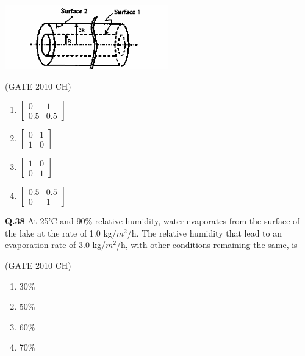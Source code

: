 \documentclass[journal,12pt,onecolumn]{exam}
\theoremstyle{remark}
\begin{document}
 \includegraphics[width=1.0\linewidth]{images/Q.37 image.png}
     
\hfill{(GATE 2010 CH)}\\


\begin{enumerate}

    \item $\begin{bmatrix}
       0 & 1\\
        0.5 & 0.5
    \end{bmatrix}$
    \item $\begin{bmatrix}
       0 & 1\\
        1 & 0
    \end{bmatrix}$
    \item $\begin{bmatrix}
        1 & 0\\
        0 & 1
    \end{bmatrix}$
    \item $\begin{bmatrix}
       0.5 & 0.5\\
        0 & 1
    \end{bmatrix}$
\end{enumerate}

\noindent
\textbf{Q.38}
  At 25'C and 90\% relative humidity, water evaporates from the surface of the lake at the rate of 1.0 kg/$m^2$/h. The relative humidity that lead to an evaporation rate of 3.0 kg/$m^2$/h, with other conditions remaining the same, is

\hfill{(GATE 2010 CH)}\\

 \begin{enumerate}
     \item 30\%
     \item 50\%
     \item 60\%
     \item 70\%
 \end{enumerate}
\end{document}
